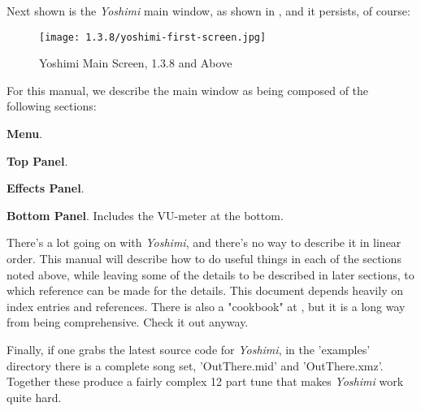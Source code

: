 \documentclass[
 11pt,
 twoside,
 a4paper,
 final                                 %
]{article}
\begin{document}
   Next shown is the \textsl{Yoshimi} main window,
   as shown in ,
   and it persists, of course:

\begin{figure}[H]
   \centering 
   \texttt{[image: 1.3.8/yoshimi-first-screen.jpg]}
   \caption{Yoshimi Main Screen, 1.3.8 and Above}
   \label{fig:yoshimi_main_screen}
\end{figure}

   For this manual, we describe the main window as being composed of
   the following sections:

\begin{enumber}
   \item \textbf{Menu}.
   \item \textbf{Top Panel}.
   \item \textbf{Effects Panel}.
   \item \textbf{Bottom Panel}.  Includes the VU-meter at the bottom.
\end{enumber}

   There's a lot going on with \textsl{Yoshimi}, and there's no way to describe
   it in linear order.  This manual will describe how to do useful things in
   each of the sections noted above, while leaving some of the details to be
   described in later sections, to which reference can be made for the details.
   This document depends heavily on index entries and references.
   There is also a "cookbook" at \cite{book}, but it is a long way from being
   comprehensive.  Check it out anyway.

   Finally, if one grabs the latest source code for \textsl{Yoshimi}, in the
   'examples' directory there is a complete song set, 'OutThere.mid' and
   'OutThere.xmz'. Together these produce a fairly complex 12 part tune that
   makes \textsl{Yoshimi} work quite hard.

\rhead{\rightmark}         %













\end{document}
